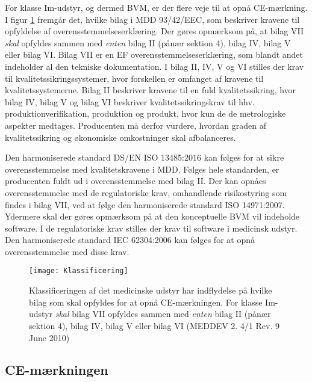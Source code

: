 For klasse Im-udstyr, og dermed BVM, er der flere veje til at opnå CE-mærkning. I figur \ref{fig:Klas} fremgår det, hvilke bilag i MDD 93/42/EEC, som beskriver kravene til opfyldelse af overensstemmelseserklæring. Der gøres opmærksom på, at bilag VII \textit{skal} opfyldes sammen med \textit{enten} bilag II (pånær sektion 4), bilag IV, bilag V eller bilag VI. Bilag VII er en EF overensstemmelseserklæring, som blandt andet indeholder al den tekniske dokumentation. I bilag II, IV, V og VI stilles der krav til kvalitetssikringssystemer, hvor forskellen er omfanget af kravene til kvalitetssystemerne. Bilag II beskriver kravene til en fuld kvalitetssikring, hvor bilag IV, bilag V og bilag VI beskriver kvalitetssikringskrav til hhv. produktionverifikation, produktion og produkt, hvor kun de de metrologiske aspekter medtages. Producenten må derfor vurdere, hvordan graden af kvalitetssikring og økonomiske omkostninger skal afbalanceres.   

    Den harmoniserede standard DS/EN ISO 13485:2016 kan følges for at sikre overensstemmelse med kvalitetskravene i MDD. Følges hele standarden, er producenten fuldt ud i overensstemmelse med bilag II.
    Der kan opnåes overensstemmelse med de regulatoriske krav, omhandlende risikostyring som findes i bilag VII, ved at følge den harmoniserede standard ISO 14971:2007.
Ydermere skal der gøres opmærksom på at den konceptuelle BVM vil indeholde software. I de regulatoriske krav stilles der krav til software i medicinsk udstyr. Den harmoniserede standard IEC 62304:2006 kan følges for at opnå overensstemmelse med disse krav.   


\begin{figure}[htb]
\centering
\texttt{[image: Klassificering]}
\caption{Klassificeringen af det medicinske udstyr har indflydelse på hvilke bilag som skal opfyldes for at opnå CE-mærkningen. For klasse Im-udstyr \textit{skal} bilag VII opfyldes sammen med \textit{enten} bilag II (pånær sektion 4), bilag IV, bilag V eller bilag VI (MEDDEV 2. 4/1 Rev. 9 June 2010)}
\label{fig:Klas}
\end{figure}

\subsection{CE-mærkningen}
   
